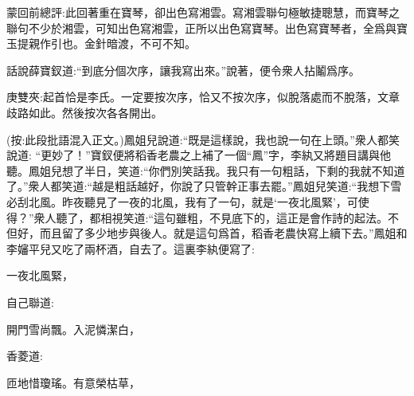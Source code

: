 

\begin{parag}
    \begin{note}蒙回前總評:此回著重在寶琴，卻出色寫湘雲。寫湘雲聯句極敏捷聰慧，而寶琴之聯句不少於湘雲，可知出色寫湘雲，正所以出色寫寶琴。出色寫寶琴者，全爲與寶玉提親作引也。金針暗渡，不可不知。\end{note}
\end{parag}


\begin{parag}
    話說薛寶釵道:“到底分個次序，讓我寫出來。”說著，便令衆人拈鬮爲序。\begin{note}庚雙夾:起首恰是李氏。一定要按次序，恰又不按次序，似脫落處而不脫落，文章歧路如此。然後按次各各開出。\end{note}(按:此段批語混入正文。)鳳姐兒說道:“既是這樣說，我也說一句在上頭。”衆人都笑說道: “更妙了！”寶釵便將稻香老農之上補了一個“鳳”字，李紈又將題目講與他聽。鳳姐兒想了半日，笑道:“你們別笑話我。我只有一句粗話，下剩的我就不知道了。”衆人都笑道:“越是粗話越好，你說了只管幹正事去罷。”鳳姐兒笑道:“我想下雪必刮北風。昨夜聽見了一夜的北風，我有了一句，就是‘一夜北風緊’，可使得？”衆人聽了，都相視笑道:“這句雖粗，不見底下的，這正是會作詩的起法。不但好，而且留了多少地步與後人。就是這句爲首，稻香老農快寫上續下去。”鳳姐和李嬸平兒又吃了兩杯酒，自去了。這裏李紈便寫了:
\end{parag}


\begin{poem}
    \begin{pl} 一夜北風緊，\end{pl}
\end{poem}


\begin{parag}
    自己聯道:
\end{parag}


\begin{poem}
    \begin{pl} 開門雪尚飄。入泥憐潔白，\end{pl}
\end{poem}


\begin{parag}
    香菱道:
\end{parag}


\begin{poem}
    \begin{pl} 匝地惜瓊瑤。有意榮枯草，\end{pl}
\end{poem}


